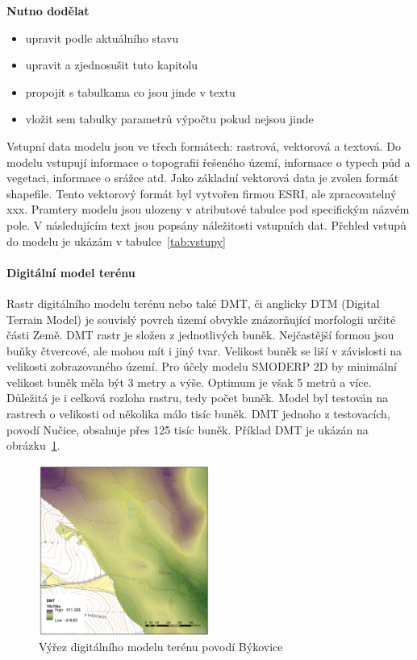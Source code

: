 
\textbf{Nutno dodělat}
\begin{itemize} \itemsep 0pt
\item upravit podle aktuálního stavu
\item upravit a zjednosušit tuto kapitolu
\item propojit s tabulkama co jsou jinde v textu
\item vložit sem tabulky parametrů výpočtu pokud nejsou jinde
\end{itemize}


Vstupní data modelu jsou ve třech formátech: rastrová, vektorová a textová. Do modelu vstupují informace o topografii řešeného území, informace o typech půd a vegetaci, informace o srážce atd. Jako základní vektorová data je zvolen formát shapefile. Tento vektorový formát byl vytvořen firmou ESRI, ale zpracovatelný xxx. Pramtery modelu jsou ulozeny v atributové tabulce pod specifickým názvém pole. 
V následujícím text jsou popsány náležitosti vstupních dat. 
% 
Přehled vstupů do modelu je ukázám v tabulce~\ref{tab:vstupy}
% 
% 

% 

\paragraph{Digitální model terénu} \label{sec:vstupdmt} 

Rastr digitálního modelu terénu nebo také DMT, či anglicky DTM (Digital Terrain Model) je souvislý povrch území obvykle znázorňující morfologii určité části Země. DMT rastr je složen z jednotlivých buněk. Nejčastější formou jsou buňky čtvercové, ale mohou mít i jiný tvar. Velikost buněk se liší v závislosti na velikosti zobrazovaného území. Pro účely modelu SMODERP 2D by minimální velikost buněk měla být 3 metry a výše. Optimum je však 5 metrů a více. Důležitá je i celková rozloha rastru, tedy počet buněk. Model byl testován na rastrech o velikosti od několika málo tisíc buněk. DMT jednoho z testovacích, povodí Nučice, obsahuje přes 125 tisíc buněk. Příklad DMT je ukázán na obrázku~\ref{fig:bykovicedmt}.


\begin{figure}
  \centering
  \includegraphics[width=0.5\textwidth]{./img/DMT_byk.png}
  \caption{Výřez digitálního modelu terénu povodí Býkovice}
  \label{fig:bykovicedmt}
\end{figure}

